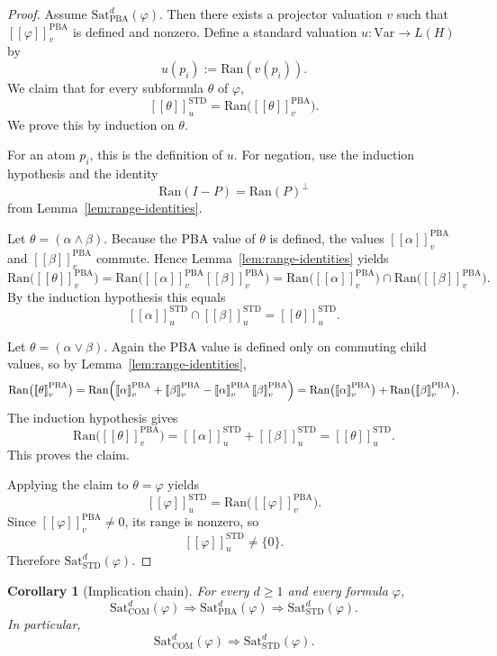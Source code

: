 \documentclass[11pt]{article}
\theoremstyle{plain}
\newtheorem{corollary}[theorem]{Corollary}
\theoremstyle{definition}
\newcommand{\STD}{\mathrm{STD}}
\newcommand{\COM}{\mathrm{COM}}
\newcommand{\PBA}{\mathrm{PBA}}
\newcommand{\Sat}{\mathrm{Sat}}
\newcommand{\Ran}{\mathrm{Ran}}
\newcommand{\Var}{\mathrm{Var}}
\newcommand{\sem}[1]{\left[\!\left[#1\right]\!\right]}
\begin{document}
\begin{proof}
Assume $\Sat_{\PBA}^d(\varphi)$.
Then there exists a projector valuation $v$ such that $\sem{\varphi}^{\PBA}_v$ is defined and nonzero.
Define a standard valuation $u:\Var\to L(H)$ by
\[
 u(p_i):=\Ran(v(p_i)).
\]
We claim that for every subformula $\theta$ of $\varphi$,
\[
\sem{\theta}^{\STD}_u = \Ran\bigl(\sem{\theta}^{\PBA}_v\bigr).
\]
We prove this by induction on $\theta$.

For an atom $p_i$, this is the definition of $u$.
For negation, use the induction hypothesis and the identity
\[
\Ran(I-P)=\Ran(P)^{\perp}
\]
from Lemma~\ref{lem:range-identities}.

Let $\theta=(\alpha\wedge\beta)$.
Because the PBA value of $\theta$ is defined, the values
$\sem{\alpha}^{\PBA}_v$ and $\sem{\beta}^{\PBA}_v$ commute.
Hence Lemma~\ref{lem:range-identities} yields
\[
\Ran\bigl(\sem{\theta}^{\PBA}_v\bigr)
=
\Ran\bigl(\sem{\alpha}^{\PBA}_v\sem{\beta}^{\PBA}_v\bigr)
=
\Ran\bigl(\sem{\alpha}^{\PBA}_v\bigr) \cap \Ran\bigl(\sem{\beta}^{\PBA}_v\bigr).
\]
By the induction hypothesis this equals
\[
\sem{\alpha}^{\STD}_u \cap \sem{\beta}^{\STD}_u = \sem{\theta}^{\STD}_u.
\]

Let $\theta=(\alpha\vee\beta)$.
Again the PBA value is defined only on commuting child values, so by Lemma~\ref{lem:range-identities},
\[
\Ran\bigl(\sem{\theta}^{\PBA}_v\bigr)
=
\Ran\Bigl(\sem{\alpha}^{\PBA}_v + \sem{\beta}^{\PBA}_v - \sem{\alpha}^{\PBA}_v\sem{\beta}^{\PBA}_v\Bigr)
=
\Ran\bigl(\sem{\alpha}^{\PBA}_v\bigr) + \Ran\bigl(\sem{\beta}^{\PBA}_v\bigr).
\]
The induction hypothesis gives
\[
\Ran\bigl(\sem{\theta}^{\PBA}_v\bigr)
=
\sem{\alpha}^{\STD}_u + \sem{\beta}^{\STD}_u
=
\sem{\theta}^{\STD}_u.
\]
This proves the claim.

Applying the claim to $\theta=\varphi$ yields
\[
\sem{\varphi}^{\STD}_u = \Ran\bigl(\sem{\varphi}^{\PBA}_v\bigr).
\]
Since $\sem{\varphi}^{\PBA}_v\neq 0$, its range is nonzero, so
\[
\sem{\varphi}^{\STD}_u \neq \{0\}.
\]
Therefore $\Sat_{\STD}^d(\varphi)$.
\end{proof}

\begin{corollary}[Implication chain]\label{cor:implication-chain}
For every $d\geq 1$ and every formula $\varphi$,
\[
\Sat_{\COM}^d(\varphi) \Longrightarrow \Sat_{\PBA}^d(\varphi) \Longrightarrow \Sat_{\STD}^d(\varphi).
\]
In particular,
\[
\Sat_{\COM}^d(\varphi) \Longrightarrow \Sat_{\STD}^d(\varphi).
\]
\end{corollary}
\end{document}
